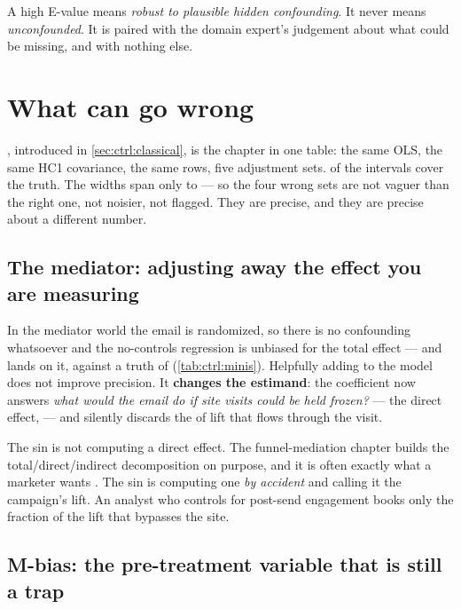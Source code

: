 A high E-value means \emph{robust to plausible hidden confounding}. It never means
\emph{unconfounded}. It is paired with the domain expert's judgement about what could be
missing, and with nothing else.

\section{What can go wrong}
\label{sec:ctrl:wrong}

, introduced in \cref{sec:ctrl:classical}, is the chapter in one table: the
same OLS, the same HC1 covariance, the same
\nbFiveN{} rows, five adjustment sets. \nbFiveNCover{} of the \nbFiveNSets{} intervals cover the
truth. The widths span only \eur{\nbFiveWidthMin} to \eur{\nbFiveWidthMax} --- so the four wrong
sets are not vaguer than the right one, not noisier, not flagged. They are precise, and they are
precise about a different number.

\subsection*{The mediator: adjusting away the effect you are measuring}

In the mediator world the email is randomized, so there is no confounding whatsoever and the
no-controls regression is unbiased for the total effect --- and lands on it,
\eur{\nbFiveMedNone} against a truth of \eur{\nbFiveMedTotalTrue} (\cref{tab:ctrl:minis}).
Helpfully adding  to the model does not improve precision. It \textbf{changes the
estimand}: the coefficient now answers \emph{what would the email do if site visits could be held
frozen?} --- the direct effect, \eur{\nbFiveMedCtrl} --- and silently discards the
\eur{\nbFiveMedIndirectTrue} of lift that flows through the visit.

The sin is not computing a direct effect. The funnel-mediation chapter builds the
total/direct/indirect decomposition on purpose, and it is often exactly what a marketer wants
\citep{imai2010}. The sin is computing one
\emph{by accident} and calling it the campaign's lift. An analyst who controls for post-send
engagement books only the fraction of the lift that bypasses the site.



\subsection*{M-bias: the pre-treatment variable that is still a trap}

